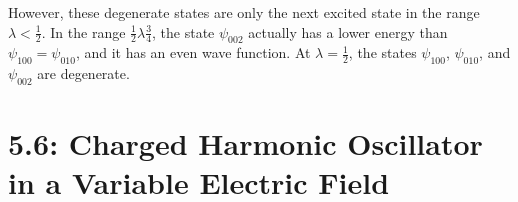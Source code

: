 \documentclass[a4paper,twoside]{article}
\begin{document}
\begin{itemize}
\begin{problem}
            However, these degenerate states are only the next excited state in the range $ \lambda < \frac{1}{2} $. In the range $ \frac{1}{2} \lambda \frac{3}{4} $, the state $ \psi_{002} $ actually has a lower energy than $ \psi_{100} = \psi_{010} $, and it has an even wave function. At $ \lambda = \frac{1}{2} $, the states $ \psi_{100} $, $ \psi_{010} $, and $ \psi_{002} $ are degenerate.
        \end{problem}
\end{itemize}

\section*{5.6: Charged Harmonic Oscillator in a Variable Electric Field}
\label{sec:5.6:_charged_harmonic_oscillator_in_a_variable_electric_field}
\end{document}
